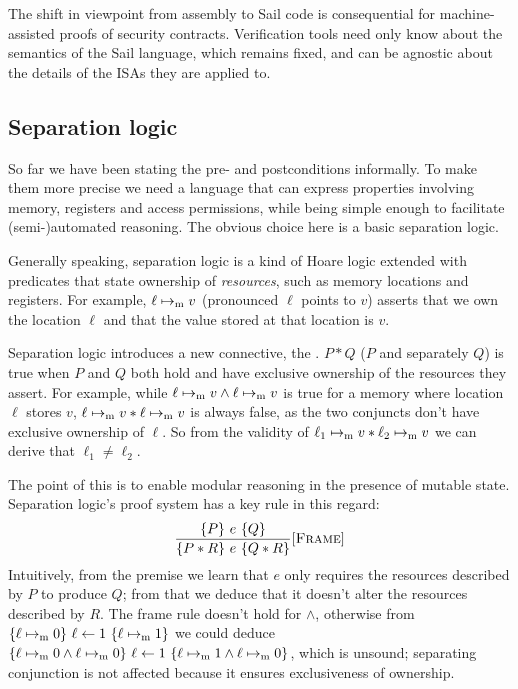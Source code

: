 The shift in viewpoint from assembly to Sail code is consequential for machine-assisted proofs of security contracts. Verification tools need only know about the semantics of the Sail language, which remains fixed, and can be agnostic about the details of the ISAs they are applied to.

\subsection{Separation logic}

So far we have been stating the pre- and postconditions informally. To make them more precise we need a language that can express properties involving memory, registers and access permissions, while being simple enough to facilitate (semi-)automated reasoning. The obvious choice here is a basic separation logic.

Generally speaking, separation logic is a kind of Hoare logic extended with predicates that state ownership of \emph{resources}, such as memory locations and registers. For example, \(\ell \mapsto_{\mathrm{m}} v\) (pronounced \(\ell\) points to \(v\)) asserts that we own the location \(\ell\) and that the value stored at that location is \(v\).

Separation logic introduces a new connective, the . \(P \ast Q\) (\(P\) and separately \(Q\)) is true when \(P\) and \(Q\) both hold and have exclusive ownership of the resources they assert. For example, while \(\ell \mapsto_{\mathrm{m}} v \wedge \ell \mapsto_{\mathrm{m}} v\) is true for a memory where location \(\ell\) stores \(v\), \(\ell \mapsto_{\mathrm{m}} v \ast \ell \mapsto_{\mathrm{m}} v\) is always false, as the two conjuncts don't have exclusive ownership of \(\ell\). So from the validity of \(\ell_1 \mapsto_{\mathrm{m}} v \ast \ell_2 \mapsto_{\mathrm{m}} v\) we can derive that \(\ell_1 \neq \ell_2\).

The point of this is to enable modular reasoning in the presence of mutable state. Separation logic's proof system has a key rule in this regard:
\[ \frac{\hoare{P}{e}{Q}}{\hoare{P \ast R}{e}{Q \ast R}}[\textsc{Frame}] \]
Intuitively, from the premise we learn that \(e\) only requires the resources described by \(P\) to produce \(Q\); from that we deduce that it doesn't alter the resources described by \(R\). The frame rule doesn't hold for \(\wedge\), otherwise from \(\hoare{\ell \ptom 0}{\ell \leftarrow 1}{\ell \ptom 1}\) we could deduce \(\hoare{\ell \ptom 0 \wedge \ell \ptom 0}{\ell \leftarrow 1}{\ell \ptom 1 \wedge \ell \ptom 0}\), which is unsound; separating conjunction is not affected because it ensures exclusiveness of ownership.


